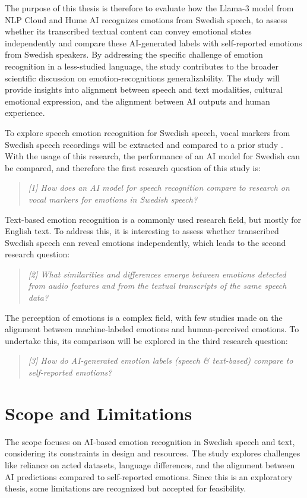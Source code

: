 The purpose of this thesis is therefore to evaluate how the Llama-3 model from NLP Cloud and Hume AI recognizes emotions from Swedish speech, to assess whether its transcribed textual content can convey emotional states independently and compare these AI-generated labels with self-reported emotions from Swedish speakers. By addressing the specific challenge of emotion recognition in a less-studied language, the study contributes to the broader scientific discussion on emotion-recognitions generalizability. The study will provide insights into alignment between speech and text modalities, cultural emotional expression, and the alignment between AI outputs and human experience.  

To explore speech emotion recognition for Swedish speech, vocal markers from Swedish speech recordings will be extracted and compared to a prior study \autocite{Ekberg2023}. With the usage of this research, the performance of an AI model for Swedish can be compared, and therefore the first research question of this study is: 

\begin{quote}
\textit{[1] How does an AI model for speech recognition compare to research on vocal markers for emotions in Swedish speech?} 
\end{quote}
Text-based emotion recognition is a commonly used research field, but mostly for English text. To address this, it is interesting to assess whether transcribed Swedish speech can reveal emotions independently, which leads to the second research question: 
\begin{quote}
    \textit{[2] What similarities and differences emerge between emotions detected from audio features and from the textual transcripts of the same speech data? }
\end{quote}
The perception of emotions is a complex field, with few studies made on the alignment between machine-labeled emotions and human-perceived emotions. To undertake this, its comparison will be explored in the third research question:  
\begin{quote}
    \textit{[3] How do AI-generated emotion labels (speech \& text-based) compare to self-reported emotions?}
\end{quote}

\section{Scope and Limitations}
The scope focuses on AI-based emotion recognition in Swedish speech and text, considering its constraints in design and resources. The study explores challenges like reliance on acted datasets, language differences, and the alignment between AI predictions compared to self-reported emotions. Since this is an exploratory thesis, some limitations are recognized but accepted for feasibility. 

